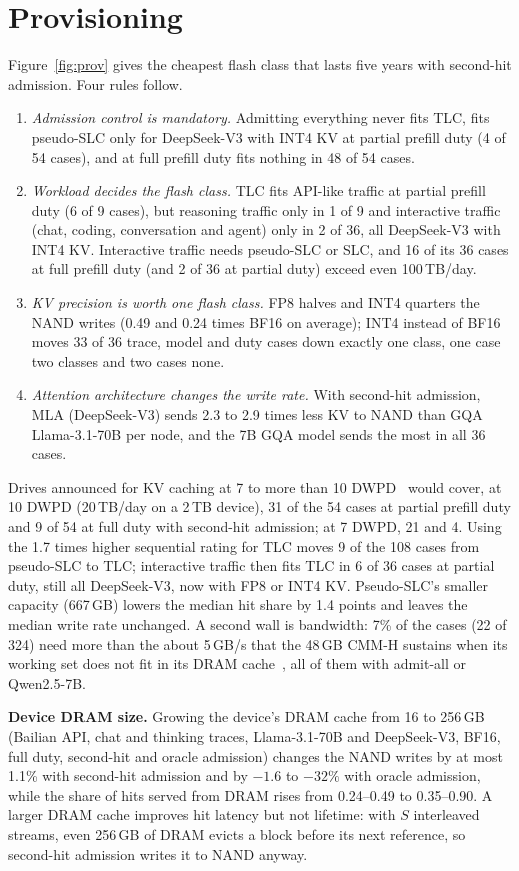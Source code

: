 \documentclass[acmsmall,screen,review]{acmart}
\begin{document}
\section{Provisioning}
\label{sec:prov}
Figure~\ref{fig:prov} gives the cheapest flash class that lasts five years with second-hit
admission. Four rules follow.
\begin{enumerate}
\item \emph{Admission control is mandatory.} Admitting everything never fits TLC, fits pseudo-SLC only for
DeepSeek-V3 with INT4 KV at partial prefill duty (4 of 54 cases), and at full prefill duty fits
nothing in 48 of 54 cases.
\item \emph{Workload decides the flash class.} TLC fits API-like traffic at partial prefill duty
(6 of 9 cases), but reasoning traffic only in 1 of 9 and interactive traffic (chat, coding,
conversation and agent) only in 2 of 36, all DeepSeek-V3 with INT4 KV. Interactive
traffic needs pseudo-SLC or SLC, and 16 of its 36 cases at full prefill duty (and 2 of 36 at partial
duty) exceed even 100\,TB/day.
\item \emph{KV precision is worth one flash class.} FP8 halves and INT4 quarters the NAND
writes (0.49 and 0.24 times BF16 on average); INT4 instead of BF16 moves 33 of 36 trace, model and
duty cases down exactly one class, one case two classes and two cases none.
\item \emph{Attention architecture changes the write rate.} With second-hit admission, MLA
(DeepSeek-V3) sends 2.3 to 2.9 times less KV to NAND than GQA Llama-3.1-70B per node, and the 7B GQA
model sends the most in all 36 cases.
\end{enumerate}
Drives announced for KV caching at 7 to more than 10 DWPD~\cite{scaleflux} would cover, at 10 DWPD
(20\,TB/day on a 2\,TB device), 31 of the 54 cases at partial prefill duty and 9 of 54 at full duty with
second-hit admission; at 7 DWPD, 21 and 4. Using the 1.7 times higher sequential rating for TLC moves 9 of the 108 cases from pseudo-SLC to
TLC; interactive traffic then fits TLC in 6 of 36 cases at partial duty, still all DeepSeek-V3, now
with FP8 or INT4 KV. Pseudo-SLC's smaller capacity (667\,GB) lowers the median hit share by 1.4 points
and leaves the median write rate unchanged. A second wall is bandwidth: 7\% of the
cases (22 of 324) need more than the about 5\,GB/s that the 48\,GB CMM-H sustains when its working
set does not fit in its DRAM cache~\cite{cmmh_hs}, all of them with admit-all or Qwen2.5-7B.

\textbf{Device DRAM size.} Growing the device's DRAM cache from 16 to 256\,GB (Bailian API, chat
and thinking traces, Llama-3.1-70B and DeepSeek-V3, BF16, full duty, second-hit and oracle
admission) changes the NAND writes by at most 1.1\% with second-hit admission and by $-1.6$ to $-32\%$ with
oracle admission, while the share of hits served from DRAM rises from 0.24--0.49 to 0.35--0.90. A
larger DRAM cache improves hit latency but not lifetime: with $S$ interleaved streams, even 256\,GB
of DRAM evicts a block before its next reference, so second-hit admission writes it to NAND anyway.
\end{document}
